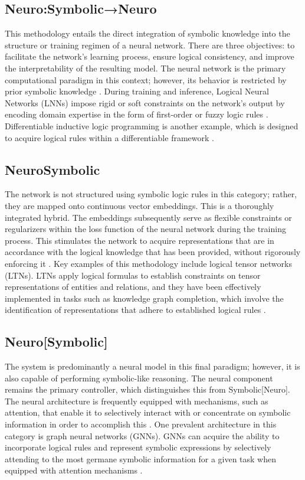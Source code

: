 \documentclass[12pt, a4paper]{report}
\begin{document}
\subsection{Neuro:Symbolic→Neuro}
This methodology entails the direct integration of symbolic knowledge into the structure or training regimen of a neural network. There are three objectives: to facilitate the network's learning process, ensure logical consistency, and improve the interpretability of the resulting model. The neural network is the primary computational paradigm in this context; however, its behavior is restricted by prior symbolic knowledge \citep{chaudhuri2021neurosymbolic}.  During training and inference, Logical Neural Networks (LNNs) impose rigid or soft constraints on the network's output by encoding domain expertise in the form of first-order or fuzzy logic rules \citep{chaudhuri2021neurosymbolic}. Differentiable inductive logic programming is another example, which is designed to acquire logical rules within a differentiable framework \citep{chaudhuri2021neurosymbolic}.

\subsection{NeuroSymbolic}

The network is not structured using symbolic logic rules in this category; rather, they are mapped onto continuous vector embeddings. This is a thoroughly integrated hybrid. The embeddings subsequently serve as flexible constraints or regularizers within the loss function of the neural network during the training process. This stimulates the network to acquire representations that are in accordance with the logical knowledge that has been provided, without rigorously enforcing it \citep{chaudhuri2021neurosymbolic}. Key examples of this methodology include logical tensor networks (LTNs). LTNs apply logical formulas to establish constraints on tensor representations of entities and relations, and they have been effectively implemented in tasks such as knowledge graph completion, which involve the identification of representations that adhere to established logical rules \citep{chaudhuri2021neurosymbolic}.
\subsection{Neuro[Symbolic]}
The system is predominantly a neural model in this final paradigm; however, it is also capable of performing symbolic-like reasoning. The neural component remains the primary controller, which distinguishes this from Symbolic[Neuro]. The neural architecture is frequently equipped with mechanisms, such as attention, that enable it to selectively interact with or concentrate on symbolic information in order to accomplish this \citep{chaudhuri2021neurosymbolic}. One prevalent architecture in this category is graph neural networks (GNNs). GNNs can acquire the ability to incorporate logical rules and represent symbolic expressions by selectively attending to the most germane symbolic information for a given task when equipped with attention mechanisms \citep{chaudhuri2021neurosymbolic}.
\end{document}

